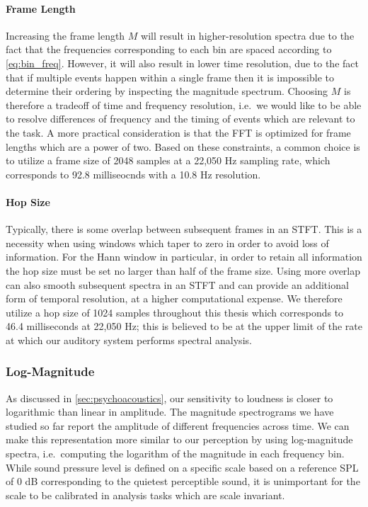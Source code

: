 \paragraph{Frame Length}

Increasing the frame length $M$ will result in higher-resolution spectra due to the fact that the frequencies corresponding to each bin are spaced according to \cref{eq:bin_freq}.
However, it will also result in lower time resolution, due to the fact that if multiple events happen within a single frame then it is impossible to determine their ordering by inspecting the magnitude spectrum.
Choosing $M$ is therefore a tradeoff of time and frequency resolution, i.e.\ we would like to be able to resolve differences of frequency and the timing of events which are relevant to the task.
A more practical consideration is that the FFT is optimized for frame lengths which are a power of two.
Based on these constraints, a common choice is to utilize a frame size of 2048 samples at a 22,050 Hz sampling rate, which corresponds to 92.8 milliseocnds with a 10.8 Hz resolution.

\paragraph{Hop Size}

Typically, there is some overlap between subsequent frames in an STFT.
This is a necessity when using windows which taper to zero in order to avoid loss of information.
For the Hann window in particular, in order to retain all information the hop size must be set no larger than half of the frame size.
Using more overlap can also smooth subsequent spectra in an STFT and can provide an additional form of temporal resolution, at a higher computational expense.
We therefore utilize a hop size of 1024 samples throughout this thesis which corresponds to 46.4 milliseconds at 22,050 Hz; this is believed to be at the upper limit of the rate at which our auditory system performs spectral analysis.

\subsubsection{Log-Magnitude}

As discussed in \cref{sec:psychoacoustics}, our sensitivity to loudness is closer to logarithmic than linear in amplitude.
The magnitude spectrograms we have studied so far report the amplitude of different frequencies across time.
We can make this representation more similar to our perception by using log-magnitude spectra, i.e.\ computing the logarithm of the magnitude in each frequency bin.
While sound pressure level is defined on a specific scale based on a reference SPL of 0 dB corresponding to the quietest perceptible sound, it is unimportant for the scale to be calibrated in analysis tasks which are scale invariant.


